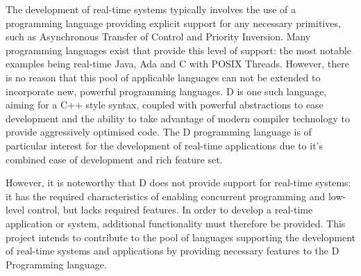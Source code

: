 The development of real-time systems typically involves the use of a programming 
language providing explicit support for any necessary primitives, such as 
Asynchronous Transfer of Control and Priority Inversion. 
Many programming languages exist that provide this level of support: the most 
notable examples being real-time Java, Ada and C with POSIX Threads. However, 
there is no reason that this pool of applicable languages can not be extended to 
incorporate new, powerful programming languages. 
D is one such language, aiming for a C++ style syntax, coupled with powerful 
abstractions to ease development and the ability to take advantage of modern 
compiler technology to provide aggressively optimised code.
The D programming language is of particular interest for 
the development of real-time applications due to it's combined ease of development
and rich feature set. 
\par\bigskip\noindent
However, it is noteworthy that D does not provide support for real-time systems: 
it has the required characteristics of enabling concurrent programming and low-level 
control, but lacks required features. 
In order to develop a real-time application or system, additional functionality 
must therefore be provided.
This project intends to contribute to the pool of languages supporting the development 
of real-time systems and applications by providing necessary features 
to the D Programming language. 
